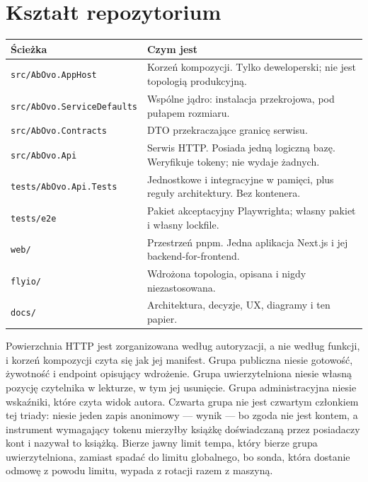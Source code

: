 \documentclass[11pt,a4paper]{article}
\begin{document}
\section{Kształt repozytorium}

\begin{table}[ht]
\centering
\small
\begin{tabular}{@{}ll@{}}
\toprule
\textbf{Ścieżka} & \textbf{Czym jest} \\
\midrule
\texttt{src/AbOvo.AppHost}        & Korzeń kompozycji. Tylko deweloperski; nie jest topologią produkcyjną. \\
\texttt{src/AbOvo.ServiceDefaults} & Wspólne jądro: instalacja przekrojowa, pod pułapem rozmiaru. \\
\texttt{src/AbOvo.Contracts}      & DTO przekraczające granicę serwisu. \\
\texttt{src/AbOvo.Api}            & Serwis HTTP. Posiada jedną logiczną bazę. Weryfikuje tokeny; nie wydaje żadnych. \\
\texttt{tests/AbOvo.Api.Tests}    & Jednostkowe i integracyjne w pamięci, plus reguły architektury. Bez kontenera. \\
\texttt{tests/e2e}                & Pakiet akceptacyjny Playwrighta; własny pakiet i własny lockfile. \\
\texttt{web/}                     & Przestrzeń pnpm. Jedna aplikacja Next.js i jej backend-for-frontend. \\
\texttt{flyio/}                   & Wdrożona topologia, opisana i nigdy niezastosowana. \\
\texttt{docs/}                    & Architektura, decyzje, UX, diagramy i ten papier. \\
\bottomrule
\end{tabular}
\end{table}

Powierzchnia HTTP jest zorganizowana według autoryzacji, a nie według funkcji, i korzeń
kompozycji czyta się jak jej manifest. Grupa publiczna niesie gotowość, żywotność i endpoint
opisujący wdrożenie. Grupa uwierzytelniona niesie własną pozycję czytelnika w lekturze, w tym
jej usunięcie. Grupa administracyjna niesie wskaźniki, które czyta widok autora. Czwarta grupa
nie jest czwartym członkiem tej triady: niesie jeden zapis anonimowy --- wynik --- bo zgoda nie
jest kontem, a instrument wymagający tokenu mierzyłby książkę doświadczaną przez posiadaczy
kont i nazywał to książką. Bierze jawny limit tempa, który bierze grupa uwierzytelniona,
zamiast spadać do limitu globalnego, bo sonda, która dostanie odmowę z powodu limitu, wypada z
rotacji razem z maszyną.
\end{document}
